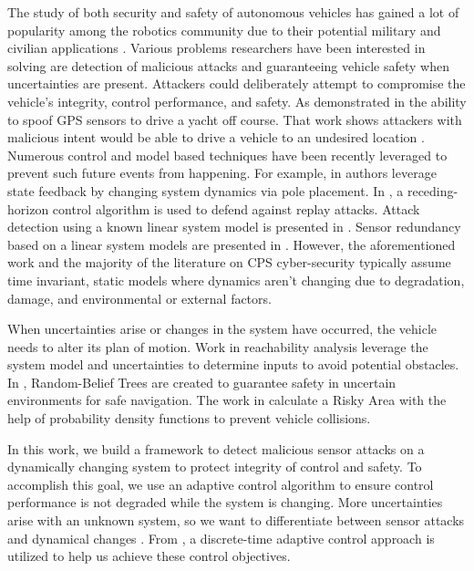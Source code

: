 The study of both security and safety of autonomous vehicles has gained a lot of popularity among the robotics community due to their potential military and civilian applications . Various problems researchers have been interested in solving are detection of malicious attacks and guaranteeing vehicle safety when uncertainties are present. Attackers could deliberately attempt to compromise the vehicle's integrity, control performance, and safety.  As demonstrated in \cite{lee} the ability to spoof GPS sensors to drive a yacht off course. That work shows attackers with malicious intent would be able to drive a vehicle to an undesired location . Numerous control and model based techniques have been recently leveraged to prevent such future events from happening. For example, in \cite{6426811} authors leverage state feedback by changing system dynamics via pole placement. In \cite{zhu2012resilient}, a receding-horizon control algorithm is used to defend against replay attacks. Attack detection using a known linear system model is presented in \cite{pasqualetti2013attack}. Sensor redundancy based on a linear system models are presented in \cite{fawzi2014secure,6943080,7330811} . However, the aforementioned work and the majority of the literature on CPS cyber-security typically assume time invariant, static models where dynamics aren't changing due to degradation, damage, and environmental or external factors.

When uncertainties arise or changes in the system have occurred, the vehicle needs to alter its plan of motion. Work in reachability analysis \cite{8046382,7799325,5980268} leverage the system model and uncertainties to determine inputs to avoid potential obstacles. In \cite{5980508}, Random-Belief Trees are created to guarantee safety in uncertain environments for safe navigation. The work in \cite{6934041} calculate a Risky Area with the help of probability density functions to prevent vehicle collisions. 


In this work, we build a framework to detect malicious sensor attacks on a dynamically changing system to protect integrity of control and safety. To accomplish this goal, we use an adaptive control algorithm to ensure control performance is not degraded while the system is changing. More uncertainties arise with an unknown system, so we want to differentiate between sensor attacks and dynamical changes .  From \cite{tao2003adaptive,Goodwin1643720}, a  discrete-time adaptive control approach is utilized to help us achieve these control objectives.

